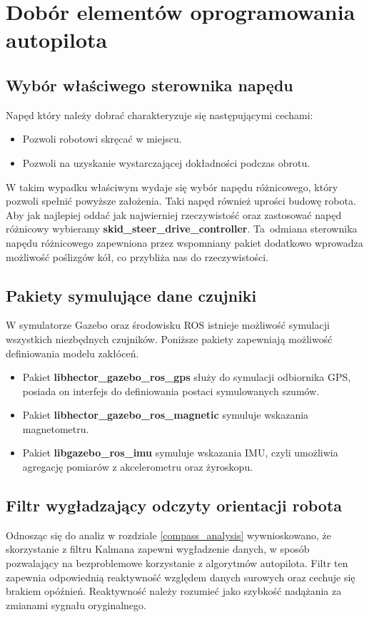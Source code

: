 \newpage
\label{soft_choice}
\section{Dobór elementów oprogramowania autopilota}
{
    \subsection{Wybór właściwego sterownika napędu}
    {
        Napęd który należy dobrać charakteryzuje się następującymi cechami:
        \begin{itemize}
            \item Pozwoli robotowi skręcać w miejscu.
            \item Pozwoli na uzyskanie wystarczającej dokładności podczas obrotu.
        \end{itemize}
        W takim wypadku właściwym wydaje się wybór napędu różnicowego, który pozwoli spełnić powyższe założenia. Taki napęd również uprości budowę robota.
        Aby jak najlepiej oddać jak najwierniej rzeczywistość oraz zastosować napęd różnicowy wybieramy \textbf{skid\_steer\_drive\_controller}. Ta~odmiana sterownika napędu różnicowego zapewniona przez wspomniany pakiet dodatkowo wprowadza możliwość poślizgów kół, co przybliża nas do rzeczywistości.
    }
    \subsection{Pakiety symulujące dane czujniki}
    {
        \label{sensor_pkgs}
        W symulatorze Gazebo oraz środowisku ROS istnieje możliwość symulacji wszystkich niezbędnych czujników. Poniższe pakiety zapewniają możliwość definiowania modelu zakłóceń.
        \begin{itemize}
            \item Pakiet \textbf{libhector\_gazebo\_ros\_gps} służy do symulacji odbiornika GPS, 
            posiada on interfejs do definiowania postaci symulowanych szumów.
            \item Pakiet \textbf{libhector\_gazebo\_ros\_magnetic}  symuluje wskazania magnetometru.
            \item Pakiet \textbf{libgazebo\_ros\_imu} symuluje wskazania IMU, czyli umożliwia agregację pomiarów z akcelerometru oraz żyroskopu. 
        \end{itemize}
    }
    \subsection{Filtr wygładzający odczyty orientacji robota}
    {
        Odnosząc się do analiz w rozdziale \ref{compass_analysis} wywnioskowano, że skorzystanie z filtru Kalmana zapewni wygładzenie danych, w sposób pozwalający na bezproblemowe korzystanie z algorytmów autopilota. Filtr ten zapewnia odpowiednią reaktywność względem danych surowych oraz cechuje się brakiem opóźnień. Reaktywność należy rozumieć jako szybkość nadążania za zmianami sygnału oryginalnego.

}}
